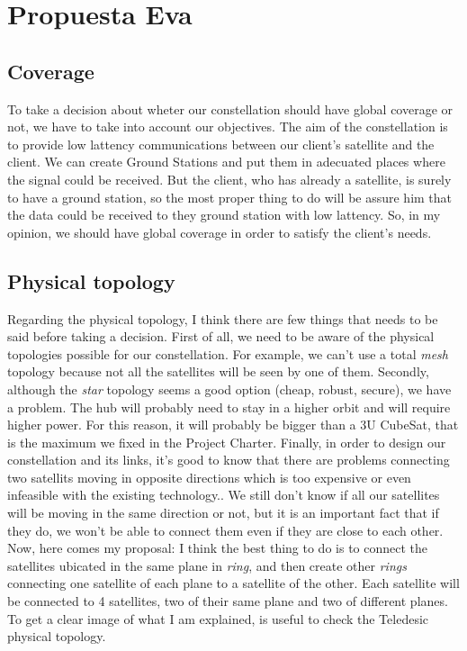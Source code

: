 \section{Propuesta Eva}
\subsection{Coverage}
To take a decision about wheter our constellation should have global coverage or not, we have to take into account our objectives. The aim of the constellation is to provide low lattency communications between our client's satellite and the client. We can create Ground Stations and put them in adecuated places where the signal could be received. But the client, who has already a satellite, is surely to have a ground station, so the most proper thing to do will be assure him that the data could be received to they ground station with low lattency. So, in my opinion, we should have global coverage in order to satisfy the client's needs. 
\subsection{Physical topology}
Regarding the physical topology, I think there are few things that needs to be said before taking a decision. First of all, we need to be aware of the physical topologies possible for our constellation. For example, we can't use a total \textit{mesh} topology because not all the satellites will be seen by one of them. Secondly, although the \textit{star} topology seems a good option (cheap, robust, secure), we have a problem. The hub will probably need to stay in a higher orbit and will require higher power. For this reason, it will probably be bigger than a 3U CubeSat, that is the maximum we fixed in the Project Charter. Finally, in order to design our constellation and its links, it's good to know that there are problems connecting two satellits moving in opposite directions which is too expensive or even infeasible with the existing technology.\cite{Ferreira2002}. We still don't know if all our satellites will be moving in the same direction or not, but it is an important fact that if they do, we won't be able to connect them even if they are close to each other. Now, here comes my proposal: I think the best thing to do is to connect the satellites ubicated in the same plane in \textit{ring}, and then create other \textit{rings} connecting one satellite of each plane to a satellite of the other. Each satellite will be connected to 4 satellites, two of their same plane and two of different planes. To get a clear image of what I am explained, is useful to check the Teledesic physical topology.\cite{Wood2003}\\

